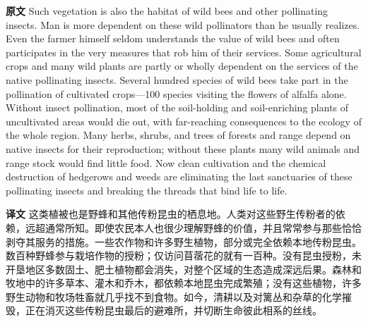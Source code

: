 \documentclass[UTF8,zihao=-4]{ctexart}
\begin{document}
\noindent\textbf{原文} Such vegetation is also the habitat of wild bees and other pollinating insects. Man is more dependent on these wild pollinators than he usually realizes. Even the farmer himself seldom understands the value of wild bees and often participates in the very measures that rob him of their services. Some agricultural crops and many wild plants are partly or wholly dependent on the services of the native pollinating insects. Several hundred species of wild bees take part in the pollination of cultivated crops---100 species visiting the flowers of alfalfa alone. Without insect pollination, most of the soil-holding and soil-enriching plants of uncultivated areas would die out, with far-reaching consequences to the ecology of the whole region. Many herbs, shrubs, and trees of forests and range depend on native insects for their reproduction; without these plants many wild animals and range stock would find little food. Now clean cultivation and the chemical destruction of hedgerows and weeds are eliminating the last sanctuaries of these pollinating insects and breaking the threads that bind life to life.
\par
\noindent\textbf{译文} 这类植被也是野蜂和其他传粉昆虫的栖息地。人类对这些野生传粉者的依赖，远超通常所知。即使农民本人也很少理解野蜂的价值，并且常常参与那些恰恰剥夺其服务的措施。一些农作物和许多野生植物，部分或完全依赖本地传粉昆虫。数百种野蜂参与栽培作物的授粉；仅访问苜蓿花的就有一百种。没有昆虫授粉，未开垦地区多数固土、肥土植物都会消失，对整个区域的生态造成深远后果。森林和牧地中的许多草本、灌木和乔木，都依赖本地昆虫完成繁殖；没有这些植物，许多野生动物和牧场牲畜就几乎找不到食物。如今，清耕以及对篱丛和杂草的化学摧毁，正在消灭这些传粉昆虫最后的避难所，并切断生命彼此相系的丝线。
\par\medskip
\end{document}
